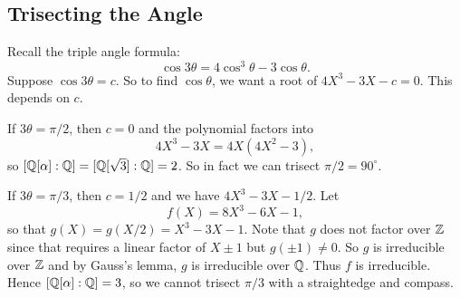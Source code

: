 \subsection{Trisecting the Angle}
Recall the triple angle formula:
\[\cos 3\theta = 4\cos^3 \theta - 3\cos \theta.\]
Suppose $\cos 3\theta = c$. So to find $\cos \theta$,
we want a root of $4X^3 - 3X - c = 0$. This depends on
$c$.

\begin{example}
If $3\theta = \pi / 2$, then $c = 0$ and
the polynomial factors into
\[4X^3 - 3X = 4X(4X^2 - 3),\]
so $[\mathbb{Q}[\alpha] : \mathbb{Q}] = [\mathbb{Q}[\sqrt{3}] : \mathbb{Q}] = 2$.
So in fact we can trisect $\pi / 2 = 90^\circ$.
\end{example}

\begin{example}
  If $3\theta = \pi / 3$, then $c = 1 / 2$ and
  we have $4X^3 - 3X - 1 / 2$. Let
  \[
    f(X) = 8X^3 - 6X - 1,
  \]
  so that $g(X) = g(X / 2) = X^3 - 3X - 1$. Note
  that $g$ does not factor over $\mathbb{Z}$ since that
  requires a linear factor of $X \pm 1$ but
  $g(\pm 1) \ne 0$. So $g$ is irreducible over $\mathbb{Z}$
  and by Gauss's lemma, $g$ is irreducible over $\mathbb{Q}$.
  Thus $f$ is irreducible. Hence
  $[\mathbb{Q}[\alpha] : \mathbb{Q}] = 3$, so we cannot
  trisect $\pi / 3$ with a straightedge and compass.
\end{example}
